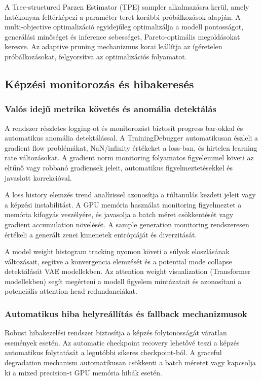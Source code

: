 A Tree-structured Parzen Estimator (TPE) sampler alkalmazásra kerül, amely hatékonyan feltérképezi a paraméter teret korábbi próbálkozások alapján. A multi-objective optimalizáció egyidejűleg optimalizálja a modell pontosságot, generálási minőséget és inference sebességet, Pareto-optimális megoldásokat keresve. Az adaptive pruning mechanizmus korai leállítja az ígéretelen próbálkozásokat, felgyorsítva az optimalizációs folyamatot.

\subsection{Képzési monitorozás és hibakeresés}

\subsubsection{Valós idejű metrika követés és anomália detektálás}
A rendszer részletes logging-ot és monitorozást biztosít progress bar-okkal és automatikus anomália detektálással. A TrainingDebugger automatikusan észleli a gradient flow problémákat, NaN/infinity értékeket a loss-ban, és hirtelen learning rate változásokat. A gradient norm monitoring folyamatos figyelemmel követi az eltűnő vagy robbanó gradiensek jeleit, automatikus figyelmeztetésekkel és javaslott korrekcióval.

A loss history elemzés trend analízissel azonosítja a túltanulás kezdeti jeleit vagy a képzési instabilitást. A GPU memória használat monitoring figyelmeztet a memória kifogyás veszélyére, és javasolja a batch méret csökkentését vagy gradient accumulation növelését. A sample generation monitoring rendszeresen értékeli a generált zenei kimenetek entrópiáját és diverzitását.

A model weight histogram tracking nyomon követi a súlyok eloszlásának változásait, segítve a konvergencia elemzését és a potential mode collapse detektálását VAE modellekben. Az attention weight visualization (Transformer modellekben) segít megérteni a modell figyelem mintázatait és azonosítani a potenciális attention head redundanciákat.

\subsubsection{Automatikus hiba helyreállítás és fallback mechanizmusok}
Robust hibakezelési rendszer biztosítja a képzés folytonosságát váratlan események esetén. Az automatic checkpoint recovery lehetővé teszi a képzés automatikus folytatását a legutóbbi sikeres checkpoint-ból. A graceful degradation mechanism automatikusan csökkenti a batch méretet vagy kapcsolja ki a mixed precision-t GPU memória hibák esetén.

